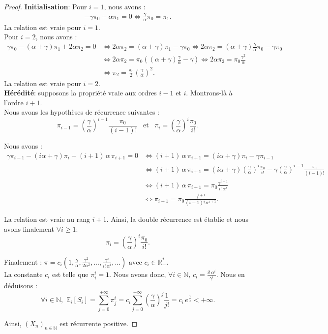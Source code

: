 \documentclass[12pt,a4paper]{report}
\theoremstyle{remark}
\begin{document}
\begin{proof}
\textbf{Initialisation}: Pour $i=1$, nous avons :
\begin{align*}
 -\gamma\pi_0+\alpha\pi_1 = 0 \iff  \frac{\gamma}{\alpha}\pi_0=\pi_1.
\end{align*}
La relation est vraie pour $i=1$.\\

Pour $i=2$, nous avons :
\begin{align*}
 \gamma\pi_{0}-(\alpha + \gamma)\pi_{1}+2\alpha\pi_{2} = 0 &\iff 2\alpha\pi_{2}=(\alpha + \gamma)\pi_{1}- \gamma\pi_{0} \iff 2\alpha\pi_{2}=(\alpha + \gamma)\frac{\gamma}{\alpha}\pi_0- \gamma\pi_{0}\\
 &\iff  2\alpha\pi_{2}=\pi_0((\alpha + \gamma)\frac{\gamma}{\alpha}- \gamma ) \iff 2\alpha\pi_{2}=\pi_0\frac{\gamma^2}{\alpha} \\
 &\iff \pi_{2}=\frac{\pi_0}{2}\left(\frac{\gamma}{\alpha}\right)^2.
\end{align*}
La relation est vraie pour $i=2$.\\

\textbf{Hérédité}: supposons la propriété vraie aux ordres $i-1$ et $i$. Montrons-là à l'ordre $i+1$.\\

Nous avons les hypothèses de récurrence suivantes : 
$$\pi_{i-1} = \left(\frac{\gamma}{\alpha}\right)^{i-1}\frac{\pi_0}{(i-1)!} \, \, \, \text{ et } \, \, \, \pi_i = \left(\frac{\gamma}{\alpha}\right)^{i}\frac{\pi_0}{i!}.$$

Nous avons : 
\begin{align*}
 \gamma\pi_{i-1}-(i\alpha + \gamma)\pi_{i}+(i+1) \, \alpha \, \pi_{i+1} = 0
 &\iff  (i+1) \, \alpha \, \pi_{i+1}=(i\alpha + \gamma)\pi_{i}- \gamma\pi_{i-1} \\
 &\iff  (i+1) \, \alpha \, \pi_{i+1}=(i\alpha + \gamma)\left(\frac{\gamma}{\alpha}\right)^{i}\frac{\pi_0}{i!}- \gamma\left(\frac{\gamma}{\alpha}\right)^{i-1}\frac{\pi_0}{(i-1)!}\\
&\iff (i+1) \, \alpha \, \pi_{i+1}=\pi_0\frac{\gamma^{i+1}}{i! \, \alpha^{i}}  \\
&\iff \pi_{i+1}=\pi_0\frac{\gamma^{i+1}}{(i+1)! \, \alpha^{i+1}}.
\end{align*}
 
La relation est vraie au rang $i+1$. Ainsi, la double récurrence est établie et nous avons finalement $\forall i \geqslant 1$:
$$\pi_i = \left(\frac{\gamma}{\alpha}\right)^{i}\frac{\pi_0}{i!}.$$

Finalement : $\pi = c_i \left(1, \frac{\gamma}{\alpha}, \frac{\gamma^2}{2 \alpha^2},...,\frac{\gamma^i}{i! \,  \alpha^i},... \right) \text{ avec } c_i \in \mathbb{R}_+^{*}.$ \\

La constante $c_i$ est telle que $\pi_i^i = 1$. Nous avons donc, $\forall i \in \mathbb{N}, \, c_i = \frac{i! \, \alpha^i}{\gamma^i}$. Nous en déduisons :
$$\forall i \in \mathbb{N}, \, \, \mathbb{E}_i[S_i] = \sum\limits_{j=0}^{+\infty} \pi_j^i =  c_i \sum\limits_{j=0}^{+\infty} \left(\frac{\gamma}{\alpha}\right)^j \frac{1}{j!} = c_i \, e^{\frac{\gamma}{\alpha}} < +\infty.$$

Ainsi, $(X_n)_{n \in \mathbb{N}}$ est récurrente positive.
\end{proof}
\end{document}
